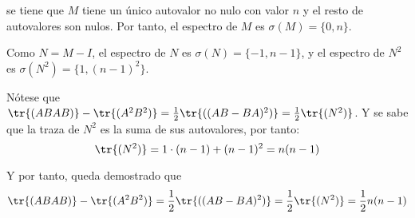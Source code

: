 \documentclass[../../main.tex]{subfiles}
\begin{document}
  se tiene que $M$ tiene un único autovalor no nulo con valor $n$ y el resto de autovalores son nulos. Por tanto, el espectro de $M$ es $\sigma(M) = \{0, n\}$.

  Como $N = M - I$, el espectro de $N$ es $\sigma(N) = \{-1, n - 1\}$, y el espectro de $N^2$ es $\sigma(N^2) = \{1, (n - 1)^2\}$.

  Nótese que $\tr{(ABAB)} - \tr{(A^2 B^2)} = \frac{1}{2}\tr{((AB - BA)^2)} = \frac{1}{2}\tr{(N^2)}$. Y se sabe que la traza de $N^2$ es la suma de sus autovalores, por tanto:
  $$
  \tr{(N^2)} = 1 \cdot (n - 1) + (n - 1)^2 = n (n - 1)
  $$

  Y por tanto, queda demostrado que 
  $$
  \tr{(ABAB)} - \tr{(A^2 B^2)} = \frac{1}{2}\tr{((AB - BA)^2)} = \frac{1}{2}\tr{(N^2)} = \frac{1}{2} n (n - 1)
  $$
\end{document}
